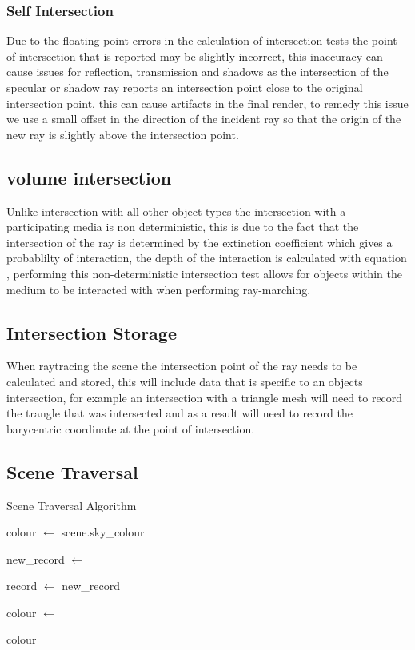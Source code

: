 \subsubsection{Self Intersection}
Due to the floating point errors in the calculation of intersection tests the point of intersection that is reported may be
slightly incorrect, this inaccuracy can cause issues for reflection, transmission and shadows as the intersection of the
specular or shadow ray reports an intersection point close to the original intersection point, this can cause artifacts in
the final render, to remedy this issue we use a small offset in the direction of the incident ray so that the origin of the
new ray is slightly above the intersection point.

\subsection{volume intersection}
Unlike intersection with all other object types the intersection with a participating media is non deterministic, this is
due to the fact that the intersection of the ray is determined by the extinction coefficient which gives a probablilty
of interaction, the depth of the interaction is calculated with equation , performing this non-deterministic
intersection test allows for objects within the medium to be interacted with when performing ray-marching.


\subsection{Intersection Storage}
When raytracing the scene the intersection point of the ray needs to be calculated and stored, this will include data that
is specific to an objects intersection, for example an intersection with a triangle mesh will need to record the trangle
that was intersected and as a result will need to record the barycentric coordinate at the point of intersection.

\subsection{Scene Traversal}
\begin{algorithm}
\begin{algorithmic}
\caption{Scene Traversal Algorithm}
\State colour $\gets$ scene.sky\_colour

	new\_record $\gets$ 


	record $\gets$ new\_record

	\EndIf

\EndFor


	colour $\gets$ 
\EndIf

\Return colour

\end{algorithmic}
\end{algorithm}

\newpage

\newpage

